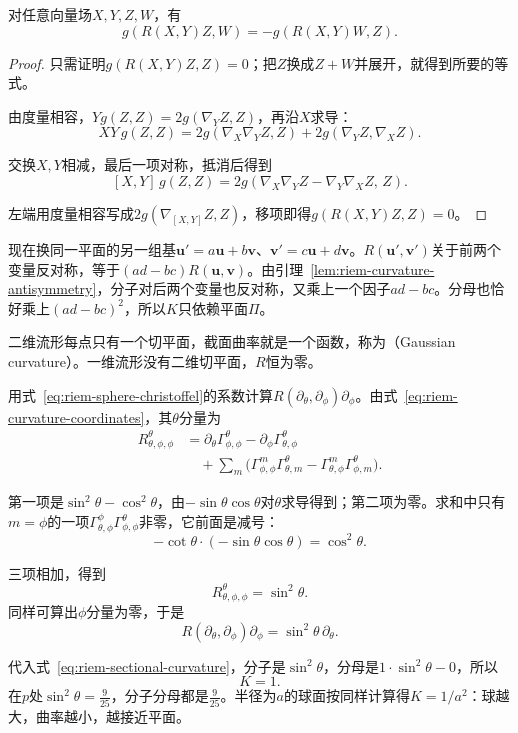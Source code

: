 \begin{lemma}[曲率的反对称性]
\label{lem:riem-curvature-antisymmetry}
对任意向量场$X,Y,Z,W$，有
\begin{equation}
g(R(X,Y)Z,W)=-g(R(X,Y)W,Z).
\label{eq:riem-curvature-antisymmetry}
\end{equation}
\end{lemma}

\begin{proof}
只需证明$g(R(X,Y)Z,Z)=0$；把$Z$换成$Z+W$并展开，就得到所要的等式。

由度量相容，$Yg(Z,Z)=2g(\nabla_YZ,Z)$，再沿$X$求导：
\[
XY\,g(Z,Z)=2g(\nabla_X\nabla_YZ,Z)+2g(\nabla_YZ,\nabla_XZ).
\]

交换$X,Y$相减，最后一项对称，抵消后得到
\[
[X,Y]\,g(Z,Z)=2g(\nabla_X\nabla_YZ-\nabla_Y\nabla_XZ,\,Z).
\]

左端用度量相容写成$2g(\nabla_{[X,Y]}Z,Z)$，移项即得$g(R(X,Y)Z,Z)=0$。
\end{proof}

现在换同一平面的另一组基$\bm u'=a\bm u+b\bm v$、$\bm v'=c\bm u+d\bm v$。$R(\bm u',\bm v')$关于前两个变量反对称，等于$(ad-bc)R(\bm u,\bm v)$。由引理~\ref{lem:riem-curvature-antisymmetry}，分子对后两个变量也反对称，又乘上一个因子$ad-bc$。分母也恰好乘上$(ad-bc)^2$，所以$K$只依赖平面$\Pi$。

二维流形每点只有一个切平面，截面曲率就是一个函数，称为（Gaussian curvature）。一维流形没有二维切平面，$R$恒为零。

\begin{example}[单位球面的曲率]
\label{ex:riem-sphere-curvature}
用式~\eqref{eq:riem-sphere-christoffel}的系数计算$R(\partial_\theta,\partial_\phi)\partial_\phi$。由式~\eqref{eq:riem-curvature-coordinates}，其$\theta$分量为
\[
\begin{aligned}
R^\theta_{\theta,\phi,\phi}
&=\partial_\theta\Gamma^\theta_{\phi,\phi}-\partial_\phi\Gamma^\theta_{\theta,\phi}\\
&\quad+\sum_m\bigl(\Gamma^m_{\phi,\phi}\Gamma^\theta_{\theta,m}-\Gamma^m_{\theta,\phi}\Gamma^\theta_{\phi,m}\bigr).
\end{aligned}
\]

第一项是$\sin^2\theta-\cos^2\theta$，由$-\sin\theta\cos\theta$对$\theta$求导得到；第二项为零。求和中只有$m=\phi$的一项$\Gamma^\phi_{\theta,\phi}\Gamma^\theta_{\phi,\phi}$非零，它前面是减号：
\[
-\cot\theta\cdot(-\sin\theta\cos\theta)=\cos^2\theta .
\]

三项相加，得到
\[
R^\theta_{\theta,\phi,\phi}=\sin^2\theta .
\]
同样可算出$\phi$分量为零，于是
\[
R(\partial_\theta,\partial_\phi)\partial_\phi=\sin^2\theta\,\partial_\theta .
\]

代入式~\eqref{eq:riem-sectional-curvature}，分子是$\sin^2\theta$，分母是$1\cdot\sin^2\theta-0$，所以
\[
K=1 .
\]
在$p$处$\sin^2\theta=\tfrac9{25}$，分子分母都是$\tfrac9{25}$。半径为$a$的球面按同样计算得$K=1/a^2$：球越大，曲率越小，越接近平面。
\end{example}

